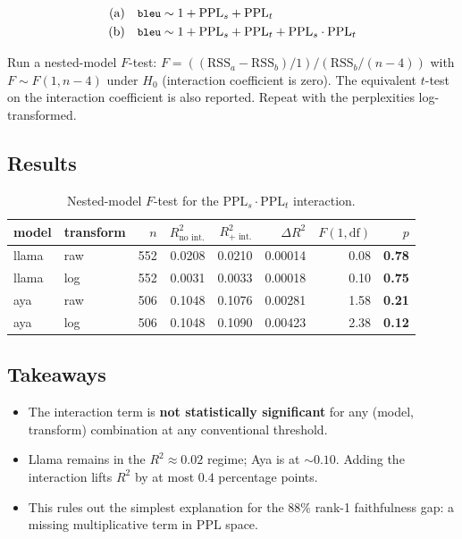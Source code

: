 \documentclass[11pt]{article}
\newcommand{\code}[1]{\texttt{\small #1}}
\newcommand{\ppl}{\mathrm{PPL}}
\begin{document}
\begin{align*}
\text{(a)} \quad &\code{bleu} \sim 1 + \ppl_s + \ppl_t \\
\text{(b)} \quad &\code{bleu} \sim 1 + \ppl_s + \ppl_t + \ppl_s \cdot \ppl_t
\end{align*}

Run a nested-model $F$-test: $F = ((\mathrm{RSS}_a - \mathrm{RSS}_b)/1) /
(\mathrm{RSS}_b / (n-4))$ with $F \sim F(1, n-4)$ under $H_0$ (interaction
coefficient is zero). The equivalent $t$-test on the interaction
coefficient is also reported. Repeat with the perplexities log-transformed.

\subsection{Results}

\begin{table}[h]
\centering
\small
\begin{tabular}{llrrrrrr}
\toprule
model & transform & $n$ & $R^2_{\text{no int.}}$ & $R^2_{\text{+ int.}}$ & $\Delta R^2$ & $F(1,\mathrm{df})$ & $p$ \\
\midrule
llama & raw & 552 & 0.0208 & 0.0210 & 0.00014 & 0.08 & \textbf{0.78} \\
llama & log & 552 & 0.0031 & 0.0033 & 0.00018 & 0.10 & \textbf{0.75} \\
aya   & raw & 506 & 0.1048 & 0.1076 & 0.00281 & 1.58 & \textbf{0.21} \\
aya   & log & 506 & 0.1048 & 0.1090 & 0.00423 & 2.38 & \textbf{0.12} \\
\bottomrule
\end{tabular}
\caption{Nested-model $F$-test for the $\ppl_s \cdot \ppl_t$ interaction.}
\end{table}

\subsection{Takeaways}

\begin{itemize}
  \item The interaction term is \textbf{not statistically significant} for
    any (model, transform) combination at any conventional threshold.
  \item Llama remains in the $R^2 \approx 0.02$ regime; Aya is at $\sim
    0.10$. Adding the interaction lifts $R^2$ by at most $0.4$ percentage
    points.
  \item This rules out the simplest explanation for the $88\%$ rank-1
    faithfulness gap: a missing multiplicative term in $\ppl$ space.
\end{itemize}
\end{document}
